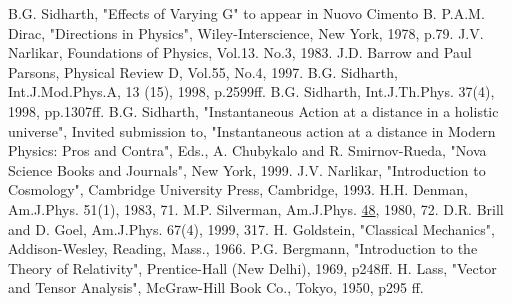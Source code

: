 \begin{thebibliography}{99}
 B.G. Sidharth, "Effects of Varying G" to appear in Nuovo Cimento B.
 P.A.M. Dirac, "Directions in Physics", Wiley-Interscience, New
York, 1978, p.79.
 J.V. Narlikar,  Foundations of Physics, Vol.13. No.3, 1983.
 J.D. Barrow and Paul Parsons, Physical Review D, Vol.55, No.4, 1997.
 B.G. Sidharth, Int.J.Mod.Phys.A, 13 (15), 1998, p.2599ff.
 B.G. Sidharth, Int.J.Th.Phys. 37(4), 1998, pp.1307ff.
 B.G. Sidharth, "Instantaneous Action at a distance in a holistic
universe", Invited submission to, "Instantaneous action at a distance in
Modern Physics: Pros and Contra", Eds., A. Chubykalo and R. Smirnov-Rueda,
"Nova Science Books and Journals", New York, 1999.
 J.V. Narlikar, "Introduction to Cosmology", Cambridge University
Press, Cambridge, 1993.
 H.H. Denman, Am.J.Phys. 51(1), 1983, 71.
 M.P. Silverman, Am.J.Phys. \underline{48}, 1980, 72.
 D.R. Brill and D. Goel, Am.J.Phys. 67(4), 1999, 317.
 H. Goldstein, "Classical Mechanics", Addison-Wesley, Reading,
Mass., 1966.
 P.G. Bergmann, "Introduction to the Theory of Relativity",
Prentice-Hall (New Delhi), 1969, p248ff.
 H. Lass, "Vector and Tensor Analysis", McGraw-Hill Book Co.,
Tokyo, 1950, p295 ff.
\end{thebibliography}

